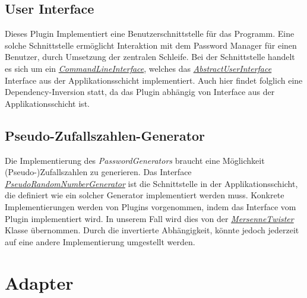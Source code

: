 \subsection{User Interface}

Dieses Plugin Implementiert eine Benutzerschnittstelle für das Programm. Eine solche Schnittstelle ermöglicht Interaktion mit dem Password Manager für einen Benutzer, durch Umsetzung der zentralen Schleife. Bei der Schnittstelle handelt es sich um ein \href{TODO:ENTER LINK AFTER MERGE}{\textit{CommandLineInterface}}, welches das \href{TODO:ENTER LINK AFTER MERGE}{\textit{AbstractUserInterface}} Interface aus der Applikationsschicht implementiert. Auch hier findet folglich eine Dependency-Inversion statt, da das Plugin abhängig von Interface aus der Applikationsschicht ist.

\subsection{Pseudo-Zufallszahlen-Generator}

Die Implementierung des \textit{PasswordGenerators} braucht eine Möglichkeit (Pseudo-)Zufallszahlen zu generieren. Das Interface \href{https://github.com/moorts/Morik/blob/main/src/application/PseudoRandomNumberGenerator.h}{\textit{PseudoRandomNumberGenerator}} ist die Schnittstelle in der Applikationsschicht, die definiert wie ein solcher Generator implementiert werden muss. Konkrete Implementierungen werden von Plugins vorgenommen, indem das Interface vom Plugin implementiert wird. In unserem Fall wird dies von der \href{https://github.com/moorts/Morik/blob/main/src/plugins/prng/MersenneTwister.h}{\textit{MersenneTwister}} Klasse übernommen. Durch die invertierte Abhängigkeit, könnte jedoch jederzeit auf eine andere Implementierung umgestellt werden.

\section{Adapter}
